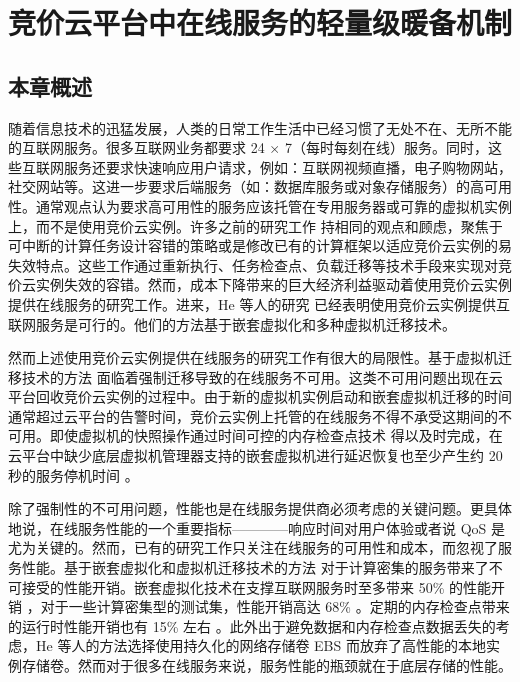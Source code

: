 \chapter{竞价云平台中在线服务的轻量级暖备机制}
\label{cha:gemini}

\section{本章概述}
\label{sec:gemini_intro}
随着信息技术的迅猛发展，人类的日常工作生活中已经习惯了无处不在、无所不能的互联网服务。很多互联网业务都要求 24 $\times$ 7（每时每刻在线）服务。同时，这些互联网服务还要求快速响应用户请求，例如：互联网视频直播，电子购物网站，社交网站等。这进一步要求后端服务（如：数据库服务或对象存储服务）的高可用性。通常观点认为要求高可用性的服务应该托管在专用服务器或可靠的虚拟机实例上，而不是使用竞价云实例。许多之前的研究工作 \cite{chohan2010see, Liu:2011:CMC:2170444.2170450, song2012optimal, Yi:2010:RCS:1844768.1845343, Andrzejak:2010:DMC:1906481.1906533} 持相同的观点和顾虑，聚焦于可中断的计算任务设计容错的策略或是修改已有的计算框架以适应竞价云实例的易失效特点。这些工作通过重新执行、任务检查点、负载迁移等技术手段来实现对竞价云实例失效的容错。然而，成本下降带来的巨大经济利益驱动着使用竞价云实例提供在线服务的研究工作。进来，He 等人的研究 \cite{He:2015:CCH:2749246.2749275} 已经表明使用竞价云实例提供互联网服务是可行的。他们的方法基于嵌套虚拟化和多种虚拟机迁移技术。

然而上述使用竞价云实例提供在线服务的研究工作有很大的局限性。基于虚拟机迁移技术的方法 \cite{He:2015:CCH:2749246.2749275} 面临着强制迁移导致的在线服务不可用。这类不可用问题出现在云平台回收竞价云实例的过程中。由于新的虚拟机实例启动和嵌套虚拟机迁移的时间通常超过云平台的告警时间，竞价云实例上托管的在线服务不得不承受这期间的不可用。即使虚拟机的快照操作通过时间可控的内存检查点技术 \cite{Singh:2013:YEG:2482626.2482642} 得以及时完成，在云平台中缺少底层虚拟机管理器支持的嵌套虚拟机进行延迟恢复也至少产生约 20 秒的服务停机时间 \cite{Hines:2009:PBL:1508293.1508301}。

除了强制性的不可用问题，性能也是在线服务提供商必须考虑的关键问题。更具体地说，在线服务性能的一个重要指标————响应时间对用户体验或者说 QoS 是尤为关键的。然而，已有的研究工作只关注在线服务的可用性和成本，而忽视了服务性能。基于嵌套虚拟化和虚拟机迁移技术的方法 \cite{He:2015:CCH:2749246.2749275} 对于计算密集的服务带来了不可接受的性能开销。嵌套虚拟化技术在支撑互联网服务时至多带来 50\% 的性能开销 \cite{He:2015:CCH:2749246.2749275}，对于一些计算密集型的测试集，性能开销高达 68\% \cite{Williams:2012:XVO:2168836.2168849}。定期的内存检查点带来的运行时性能开销也有 15\% 左右 \cite{Sharma:2015:SDD:2741948.2741953}。此外出于避免数据和内存检查点数据丢失的考虑，He 等人的方法选择使用持久化的网络存储卷 EBS 而放弃了高性能的本地实例存储卷。然而对于很多在线服务来说，服务性能的瓶颈就在于底层存储的性能。

